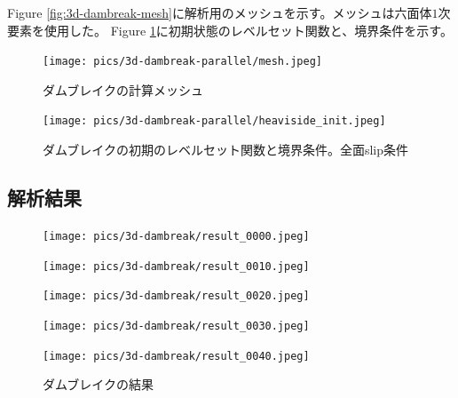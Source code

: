 Figure \ref{fig:3d-dambreak-mesh}に解析用のメッシュを示す。メッシュは六面体$1$次要素を使用した。
Figure \ref{fig:3d-dambreak-boundary}に初期状態のレベルセット関数と、境界条件を示す。

\begin{figure}[H]
	\centering
	\begin{minipage}[b]{0.49\columnwidth}
	    \centering
		\texttt{[image: pics/3d-dambreak-parallel/mesh.jpeg]}
		\caption{ダムブレイクの計算メッシュ}
		\label{fig:3d-dambreak-mesh}
	\end{minipage}
	\begin{minipage}[b]{0.49\columnwidth}
	    \centering
		\texttt{[image: pics/3d-dambreak-parallel/heaviside\_init.jpeg]}
		\caption{ダムブレイクの初期のレベルセット関数と境界条件。全面slip条件}
		\label{fig:3d-dambreak-boundary}
	\end{minipage}
\end{figure}

\subsection{解析結果}

\begin{figure}[H]
	\centering
	\begin{minipage}[b]{0.19\columnwidth}
	    \centering
	    \texttt{[image: pics/3d-dambreak/result\_0000.jpeg]}
	\end{minipage}
	\begin{minipage}[b]{0.19\columnwidth}
	    \centering
	    \texttt{[image: pics/3d-dambreak/result\_0010.jpeg]}
	\end{minipage}
	\begin{minipage}[b]{0.19\columnwidth}
	    \centering
	    \texttt{[image: pics/3d-dambreak/result\_0020.jpeg]}
	\end{minipage}
	\begin{minipage}[b]{0.19\columnwidth}
	    \centering
	    \texttt{[image: pics/3d-dambreak/result\_0030.jpeg]}
	\end{minipage}
	\begin{minipage}[b]{0.19\columnwidth}
	    \centering
	    \texttt{[image: pics/3d-dambreak/result\_0040.jpeg]}
	\end{minipage}

	\caption{ダムブレイクの結果}
	\label{fig:dambreak-result}
\end{figure}

